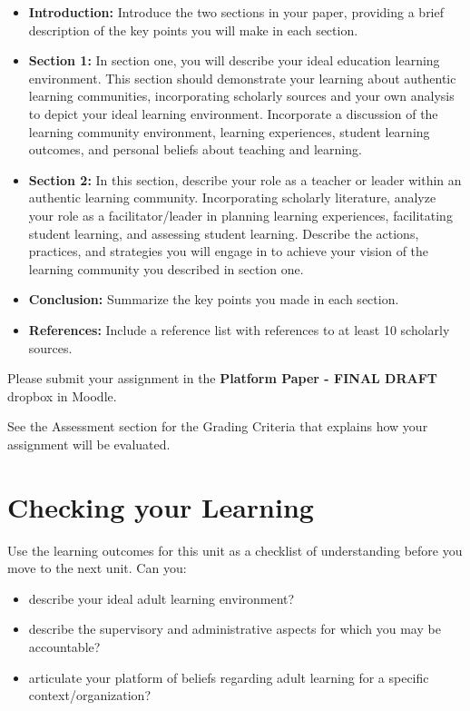 \documentclass[
]{book}
\providecommand{\tightlist}{%
  \setlength{\itemsep}{0pt}\setlength{\parskip}{0pt}}
\begin{document}
\begin{assessment}
\begin{itemize}
\tightlist
\item
  \textbf{Introduction:} Introduce the two sections in your paper,
  providing a brief description of the key points you will make in each
  section.
\item
  \textbf{Section 1:} In section one, you will describe your ideal
  education learning environment. This section should demonstrate your
  learning about authentic learning communities, incorporating scholarly
  sources and your own analysis to depict your ideal learning
  environment. Incorporate a discussion of the learning community
  environment, learning experiences, student learning outcomes, and
  personal beliefs about teaching and learning.
\item
  \textbf{Section 2:} In this section, describe your role as a teacher
  or leader within an authentic learning community. Incorporating
  scholarly literature, analyze your role as a facilitator/leader in
  planning learning experiences, facilitating student learning, and
  assessing student learning. Describe the actions, practices, and
  strategies you will engage in to achieve your vision of the learning
  community you described in section one.
\item
  \textbf{Conclusion:} Summarize the key points you made in each
  section.
\item
  \textbf{References:} Include a reference list with references to at
  least 10 scholarly sources.
\end{itemize}

Please submit your assignment in the \textbf{Platform Paper - FINAL
DRAFT} dropbox in Moodle.

See the Assessment section for the Grading Criteria that explains how
your assignment will be evaluated.
\end{assessment}

\hypertarget{checking-your-learning-9}{%
\section*{Checking your Learning}\label{checking-your-learning-9}}

\begin{progress}
Use the learning outcomes for this unit as a checklist of understanding
before you move to the next unit. Can you:

\begin{itemize}
\tightlist
\item
  describe your ideal adult learning environment?
\item
  describe the supervisory and administrative aspects for which you may
  be accountable?
\item
  articulate your platform of beliefs regarding adult learning for a
  specific context/organization?
\end{itemize}
\end{progress}
\end{document}
